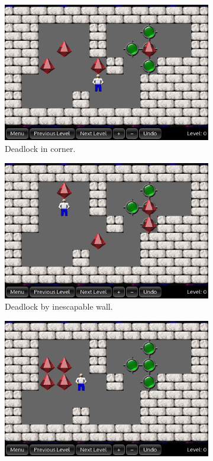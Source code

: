 \begin{figure}
\centering
\begin{subfigure}{0.3\textwidth}
  \centering
  \includegraphics[width=\linewidth]{img/deadlock_corner}
  \caption{Deadlock in corner.}
  \label{fig:deadlock_corner}
\end{subfigure}
%
\begin{subfigure}{0.3\textwidth}
  \centering
  \includegraphics[width=\linewidth]{img/deadlock_wall}
  \caption{Deadlock by inescapable wall.}
  \label{fig:deadlock_wall}
\end{subfigure}
\begin{subfigure}{0.3\textwidth}
  \centering
  \includegraphics[width=\linewidth]{img/deadlock_diamond}

\end{subfigure}
\end{figure}
